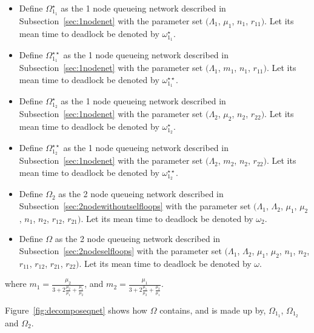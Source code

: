 \documentclass{article}
\begin{document}
\begin{itemize}
  \item Define $\Omega_{1_1}^{\star}$ as the 1 node queueing network described in Subsection~\ref{sec:1nodenet} with the parameter set $(\Lambda_1$, $\mu_1$, $n_1$, $r_{11})$. Let its mean time to deadlock be denoted by $\omega_{1_1}^{\star}$.
  \item Define $\Omega_{1_1}^{\star\star}$ as the 1 node queueing network described in Subsection~\ref{sec:1nodenet} with the parameter set $(\Lambda_1$, $m_1$, $n_1$, $r_{11})$. Let its mean time to deadlock be denoted by $\omega_{1_1}^{\star\star}$.
  \item Define $\Omega_{1_2}^{\star}$ as the 1 node queueing network described in Subsection~\ref{sec:1nodenet} with the parameter set $(\Lambda_2$, $\mu_2$, $n_2$, $r_{22})$. Let its mean time to deadlock be denoted by $\omega_{1_2}^{\star}$.
  \item Define $\Omega_{1_2}^{\star\star}$ as the 1 node queueing network described in Subsection~\ref{sec:1nodenet} with the parameter set $(\Lambda_2$, $m_2$, $n_2$, $r_{22})$. Let its mean time to deadlock be denoted by $\omega_{1_2}^{\star\star}$.
  \item Define $\Omega_2$ as the 2 node queueing network described in Subsection~\ref{sec:2nodewithoutselfloops} with the parameter set $(\Lambda_1$, $\Lambda_2$, $\mu_1$, $\mu_2$, $n_1$, $n_2$, $r_{12}$, $r_{21})$. Let its mean time to deadlock be denoted by $\omega_2$.
  \item Define $\Omega$ as the 2 node queueing network described in Subsection~\ref{sec:2nodeselfloops} with the parameter set $(\Lambda_1$, $\Lambda_2$, $\mu_1$, $\mu_2$, $n_1$, $n_2$, $r_{11}$, $r_{12}$, $r_{21}$, $r_{22})$. Let its mean time to deadlock be denoted by $\omega$.
\end{itemize}
where $m_1 = \frac{\mu_2}{3 + 2\frac{\mu_2}{\mu_1} + \frac{\mu_1}{\mu_2}}$, and $m_2 = \frac{\mu_1}{3 + 2\frac{\mu_1}{\mu_2} + \frac{\mu_2}{\mu_1}}$.

Figure~\ref{fig:decomposeqnet} shows how $\Omega$ contains, and is made up by, $\Omega_{1_1}$, $\Omega_{1_2}$ and $\Omega_2$.
\end{document}
